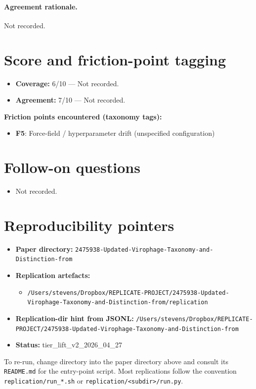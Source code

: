 \documentclass[11pt]{article}
\begin{document}
\paragraph{Agreement rationale.} Not recorded.

\section{Score and friction-point tagging}\label{sec:friction}
\begin{itemize}
\item \textbf{Coverage:} 6/10 --- Not recorded.
\item \textbf{Agreement:} 7/10 --- Not recorded.
\end{itemize}

\noindent\textbf{Friction points encountered (taxonomy tags):}
\begin{itemize}
\item \textbf{F5}: Force-field / hyperparameter drift (unspecified configuration)
\end{itemize}

\section{Follow-on questions}
\begin{itemize}
\item Not recorded.
\end{itemize}

\section{Reproducibility pointers}\label{sec:repro}
\begin{itemize}
\item \textbf{Paper directory:} \texttt{2475938-Updated-Virophage-Taxonomy-and-Distinction-from}
\item \textbf{Replication artefacts:}
\begin{itemize}
\item \texttt{/Users/stevens/Dropbox/REPLICATE-PROJECT/2475938-Updated-Virophage-Taxonomy-and-Distinction-from/replication}
\end{itemize}
\item \textbf{Replication-dir hint from JSONL:} \texttt{/Users/stevens/Dropbox/REPLICATE-PROJECT/2475938-Updated-Virophage-Taxonomy-and-Distinction-from}
\item \textbf{Status:} tier\_lift\_v2\_2026\_04\_27
\end{itemize}

To re-run, change directory into the paper directory above and consult its \texttt{README.md} for the entry-point script. Most replications follow the convention \texttt{replication/run\_*.sh} or \texttt{replication/<subdir>/run.py}.
\end{document}
